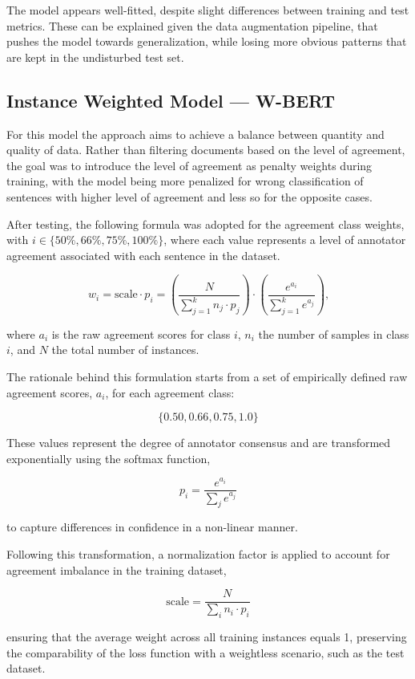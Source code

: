 \documentclass[conference]{IEEEtran}
\begin{document}
The model appears well-fitted, despite slight differences between training and test metrics. These can be explained given the data augmentation pipeline, that pushes the model towards generalization, while losing more obvious patterns that are kept in the undisturbed test set. 

\subsection{Instance Weighted Model — W-BERT}

For this model the approach aims to achieve a balance between quantity and quality of data. Rather than filtering documents based on the level of agreement, the goal was to introduce the level of agreement as penalty weights during training, with the model being more penalized for wrong classification of sentences with higher level of agreement and less so for the opposite cases.

After testing, the following formula was adopted for the agreement class weights, with $i \in \{50\%, 66\%, 75\%, 100\%\}$, where each value represents a level of annotator agreement associated with each sentence in the dataset.

$$
w_i = \text{scale} \cdot p_i = \left( \frac{N}{\sum_{j=1}^k n_j \cdot p_j} \right) \cdot  \left( \frac{e^{a_i}}{\sum_{j=1}^k e^{a_j}} \right) \text{,}
$$

\noindent where $a_i$ is the raw agreement scores for class $i$, $n_i$ the number of samples in class $i$, and $N$ the total number of instances.

The rationale behind this formulation starts from a set of empirically defined raw agreement scores, $a_i$, for each agreement class:

$$
\{0.50, 0.66, 0.75, 1.0\}
$$

These values represent the degree of annotator consensus and are transformed exponentially using the softmax function,

$$
p_i = \frac{e^{a_i}}{\sum_j e^{a_j}}
$$

\noindent to capture differences in confidence in a non-linear manner.

Following this transformation, a normalization factor is applied to account for agreement imbalance in the training dataset,

$$
\text{scale} = \frac{N}{\sum_i n_i \cdot p_i}
$$

\noindent ensuring that the average weight across all training instances equals 1, preserving the comparability of the loss function with a weightless scenario, such as the test dataset.
\end{document}
